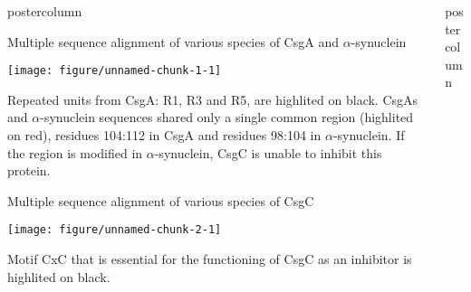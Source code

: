 \documentclass[final]{beamer}\usepackage[]{graphicx}\usepackage[]{color}
\makeatletter
\def\maxwidth{ %
  \ifdim\Gin@nat@width>\linewidth
    \linewidth
  \else
    \Gin@nat@width
  \fi
}
\def\maxwidth{ %
  \ifdim\Gin@nat@width>\linewidth
    \linewidth
  \else
    \Gin@nat@width
  \fi
}
\newlength{\columnheight}
\makeatother
\begin{document}
\begin{frame}
\begin{columns}
\begin{column}{.5\textwidth}
\begin{beamercolorbox}[center,wd=\textwidth]{postercolumn}
\begin{minipage}[T]{.99\textwidth}
{%


\vfill
\begin{block}{Multiple sequence alignment of various species of CsgA and $\alpha$-synuclein} 

\texttt{[image: figure/unnamed-chunk-1-1]} 

\justify Repeated units from CsgA: R1, R3 and R5, are highlited on black. CsgAs and $\alpha$-synuclein sequences shared only a single common region (highlited on red), residues 104{:}112 in CsgA and residues 98{:}104 in $\alpha$-synuclein. If the region is modified in $\alpha$-synuclein, CsgC is unable to inhibit this protein.
\end{block}

\begin{block}{Multiple sequence alignment of various species of CsgC}

\texttt{[image: figure/unnamed-chunk-2-1]} 

\justify Motif CxC that is essential for the functioning of CsgC as an inhibitor is highlited on black.

\end{block}
}
\end{minipage}
\end{beamercolorbox}
\end{column}



\begin{column}{.47\textwidth} %
\begin{beamercolorbox}[center,wd=\textwidth]{postercolumn}
\begin{minipage}[T]{.99\textwidth}  
\parbox[t][\columnheight]{\textwidth}
{



}
\end{minipage}
\end{beamercolorbox}
\end{column}
\end{columns}
\end{frame}
\end{document}
